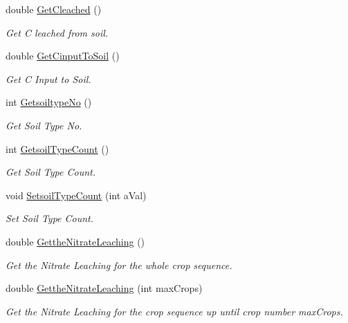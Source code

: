 \begin{DoxyCompactItemize}
double \mbox{\hyperlink{class_crop_sequence_class_a175d714ee202041183d28dc2f5053bfa}{Get\+Cleached}} ()
\begin{DoxyCompactList}\small\item\em Get C leached from soil. \end{DoxyCompactList}\item 
double \mbox{\hyperlink{class_crop_sequence_class_a7af568e3825da6fc14939143d5c92f3d}{Get\+Cinput\+To\+Soil}} ()
\begin{DoxyCompactList}\small\item\em Get C Input to Soil. \end{DoxyCompactList}\item 
int \mbox{\hyperlink{class_crop_sequence_class_a67028b47c354bfb43f638d6d031a23e7}{Getsoiltype\+No}} ()
\begin{DoxyCompactList}\small\item\em Get Soil Type No. \end{DoxyCompactList}\item 
int \mbox{\hyperlink{class_crop_sequence_class_a648e63847bb75686e6a3199f30d0087b}{Getsoil\+Type\+Count}} ()
\begin{DoxyCompactList}\small\item\em Get Soil Type Count. \end{DoxyCompactList}\item 
void \mbox{\hyperlink{class_crop_sequence_class_ab592462fb7000ed8275da763baa9d7d8}{Setsoil\+Type\+Count}} (int a\+Val)
\begin{DoxyCompactList}\small\item\em Set Soil Type Count. \end{DoxyCompactList}\item 
double \mbox{\hyperlink{class_crop_sequence_class_a77ccfdb367dfd6a8ae9b92ae9ca9eed8}{Getthe\+Nitrate\+Leaching}} ()
\begin{DoxyCompactList}\small\item\em Get the Nitrate Leaching for the whole crop sequence. \end{DoxyCompactList}\item 
double \mbox{\hyperlink{class_crop_sequence_class_a1f7dcd7a44facc951bfea675eca18c9f}{Getthe\+Nitrate\+Leaching}} (int max\+Crops)
\begin{DoxyCompactList}\small\item\em Get the Nitrate Leaching for the crop sequence up until crop number max\+Crops. \end{DoxyCompactList}\item 

\end{DoxyCompactItemize}
